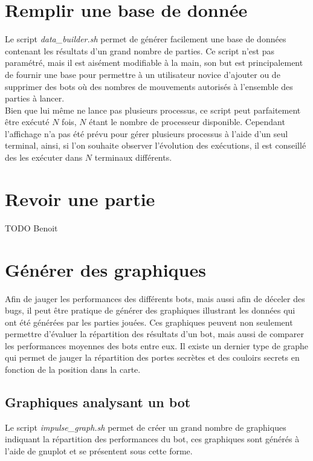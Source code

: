 \documentclass[10pt,a4paper]{report}
\begin{document}
\section{Remplir une base de donnée}
Le script \emph{data\_builder.sh} permet de générer facilement une base de
données contenant les résultats d'un grand nombre de parties. Ce script n'est
pas paramétré, mais il est aisément modifiable à la main, son but est
principalement de fournir une base pour permettre à un utilisateur novice
d'ajouter ou de supprimer des bots où des nombres de mouvements autorisés à
l'ensemble des parties à lancer.
\\
Bien que lui même ne lance pas plusieurs processus, ce script peut
parfaitement être exécuté $N$ fois, $N$ étant le nombre de processeur
disponible. Cependant l'affichage n'a pas été prévu pour gérer plusieurs
processus à l'aide d'un seul terminal, ainsi, si l'on souhaite observer
l'évolution des exécutions, il est conseillé des les exécuter dans $N$
terminaux différents.

\section{Revoir une partie}
TODO Benoit

\section{Générer des graphiques}
Afin de jauger les performances des différents bots, mais aussi afin de
déceler des bugs, il peut être pratique de générer des graphiques illustrant les
données qui ont été générées par les parties jouées. Ces graphiques peuvent
non seulement permettre d'évaluer la répartition des résultats d'un bot,
mais aussi de comparer les performances moyennes des bots entre eux. Il existe
un dernier type de graphe qui permet de jauger la répartition des portes
secrètes et des couloirs secrets en fonction de la position dans la carte.

\subsection{Graphiques analysant un bot}
Le script \emph{impulse\_graph.sh} permet de créer un grand nombre de
graphiques indiquant la répartition des performances du bot, ces graphiques
sont générés à l'aide de gnuplot et se présentent sous cette forme.
\end{document}
